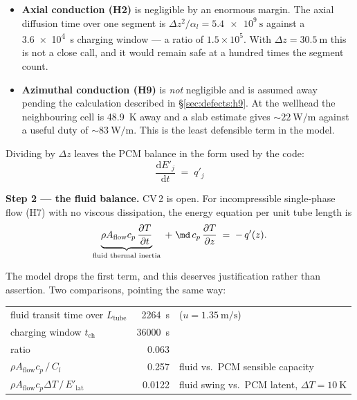 \begin{itemize}[leftmargin=1.5em,itemsep=2pt]
\item \textbf{Axial conduction (H2)} is negligible by an enormous margin. The
  axial diffusion time over one segment is $\Delta z^{2}/\alpha_{l} =
  \SI{5.4e9}{\second}$ against a \SI{3.6e4}{\second} charging window --- a ratio
  of $1.5\times10^{5}$. With $\Delta z = \SI{30.5}{\meter}$ this is not a close
  call, and it would remain safe at a hundred times the segment count.
\item \textbf{Azimuthal conduction (H9)} is \emph{not} negligible and is
  assumed away pending the calculation described in \S\ref{sec:defects:h9}. At
  the wellhead the neighbouring cell is \SI{48.9}{\kelvin} away and a slab
  estimate gives $\sim\SI{22}{\watt\per\meter}$ against a useful duty of
  $\sim\SI{83}{\watt\per\meter}$. This is the least defensible term in the
  model.
\end{itemize}

\noindent
Dividing by $\Delta z$ leaves the PCM balance in the form used by the code:
\begin{equation}
  \boxed{\;\frac{\mathrm{d}E'_{j}}{\mathrm{d}t} \;=\; q'_{j}\;}
  \label{eq:pcm-balance}
\end{equation}

\medskip
\noindent\textbf{Step 2 --- the fluid balance.}
CV\,2 is open. For incompressible single-phase flow (H7) with no viscous
dissipation, the energy equation per unit tube length is
\begin{equation}
  \underbrace{\rho A_{\mathrm{flow}} c_{p}\,\frac{\partial T}{\partial t}}
             _{\text{fluid thermal inertia}}
  \;+\;
  \md\,c_{p}\,\frac{\partial T}{\partial z}
  \;=\;
  -\,q'(z) .
  \label{eq:fluid-pde}
\end{equation}

The model drops the first term, and this deserves justification rather than
assertion. Two comparisons, pointing the same way:

\begin{center}
\begin{tabular}{@{}l r l@{}}
\toprule
fluid transit time over $L_{\mathrm{tube}}$ & \SI{2264}{\second} & ($u=\SI{1.35}{\meter\per\second}$) \\
charging window $t_{\mathrm{ch}}$           & \SI{36000}{\second} & \\
\midrule
ratio                                        & \num{0.063} & \\
$\rho A_{\mathrm{flow}}c_{p} \,/\, C_{l}$    & \num{0.257} & fluid vs.\ PCM sensible capacity \\
$\rho A_{\mathrm{flow}}c_{p}\Delta T \,/\, E'_{\mathrm{lat}}$
   & \num{0.0122} & fluid swing vs.\ PCM latent, $\Delta T=\SI{10}{\kelvin}$ \\
\bottomrule
\end{tabular}
\end{center}

